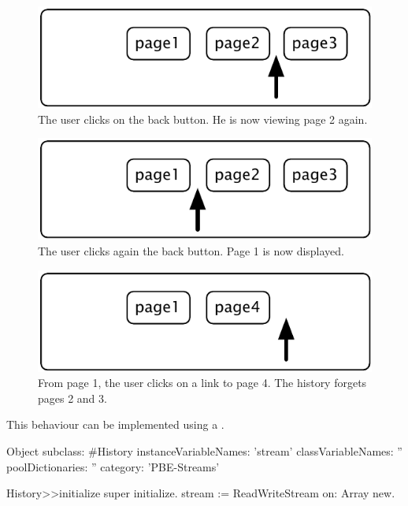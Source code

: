 \documentclass[a4paper,10pt,twoside]{book}
\begin{document}
\begin{figure}[!ht]
\centerline{\includegraphics[scale=0.5]{page2_Stef}}
\caption{The user clicks on the back button. He is now viewing page 2 again.}
\vspace{.2in}
\end{figure}

\begin{figure}[!ht]
\centerline{\includegraphics[scale=0.5]{page1_Stef}}
\caption{The user clicks again the back button. Page 1 is now displayed.}
\vspace{.2in}
\end{figure}

\begin{figure}[!ht]
\centerline{\includegraphics[scale=0.5]{page4Stef}}
\caption{From page 1, the user clicks on a link to page 4. The history forgets pages 2 and 3.}
\vspace{.2in}
\end{figure}

This behaviour can be implemented using a .

\begin{code}{}
Object subclass: #History
  instanceVariableNames: 'stream'
  classVariableNames: ''
  poolDictionaries: ''
  category: 'PBE-Streams'

History>>initialize
    super initialize.
    stream := ReadWriteStream on: Array new.
\end{code}
\end{document}
